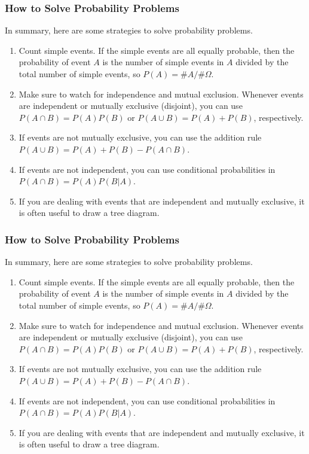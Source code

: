 \documentclass[xcolor=dvipsnames]{beamer}
\begin{document}
\begin{frame}
  \frametitle{How to Solve Probability Problems}
In summary, here are some strategies to solve probability problems.
\begin{enumerate}
\item<1-> Count simple events. If the simple events are all equally
  probable, then the probability of event $A$ is the number of simple
  events in $A$ divided by the total number of simple events, so
  $P(A)=\#A/\#\Omega$.
\item<2-> Make sure to watch for independence and mutual exclusion.
  Whenever events are independent or mutually exclusive (disjoint),
  you can use $P(A\cap{}B)=P(A)P(B)$ or $P(A\cup{}B)=P(A)+P(B)$,
  respectively.
\item<3-> If events are not mutually exclusive, you can use the
  addition rule $P(A\cup{}B)=P(A)+P(B)-P(A\cap{}B)$.
\item<4-> If events are not independent, you can use conditional
  probabilities in $P(A\cap{}B)=P(A)P(B|A)$.
\item<5-> If you are dealing with events that are independent and
  mutually exclusive, it is often useful to draw a tree diagram.
\end{enumerate}
\end{frame}

\begin{frame}
  \frametitle{How to Solve Probability Problems}
In summary, here are some strategies to solve probability problems.
\begin{enumerate}
\item Count simple events. If the simple events are all equally
  probable, then the probability of event $A$ is the number of simple
  events in $A$ divided by the total number of simple events, so
  $P(A)=\#A/\#\Omega$.
\item Make sure to watch for independence and mutual exclusion.
  Whenever events are independent or mutually exclusive (disjoint),
  you can use $P(A\cap{}B)=P(A)P(B)$ or $P(A\cup{}B)=P(A)+P(B)$,
  respectively.
\item If events are not mutually exclusive, you can use the
  addition rule $P(A\cup{}B)=P(A)+P(B)-P(A\cap{}B)$.
\item If events are not independent, you can use conditional
  probabilities in $P(A\cap{}B)=P(A)P(B|A)$.
\item If you are dealing with events that are independent and
  mutually exclusive, it is often useful to draw a tree diagram.
\end{enumerate}
\end{frame}
\end{document}
